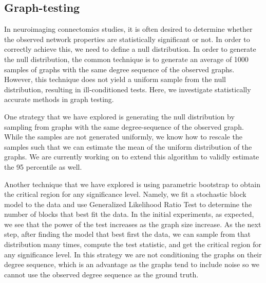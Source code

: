 \documentclass[simplex.tex]{subfiles}
\begin{document}
\subsection{Graph-testing}

In neuroimaging connectomics studies, it is often desired to determine whether the observed network properties are statistically significant or not. In order to correctly achieve this, we need to define a null distribution. In order to generate the null distribution, the common technique is to  generate an average of 1000 samples of graphs with the same degree sequence of the observed graphs. However, this technique does not yield a uniform sample from the null distribution, resulting in ill-conditioned tests. Here, we investigate statistically accurate methods in graph testing. 

One strategy that we have explored is generating the null distribution by sampling from graphs with the same degree-sequence of the observed graph. While the samples are not generated uniformly, we know how to rescale the samples such that we can estimate the mean of the uniform distribution of the graphs. We are currently working on to extend this algorithm to validly estimate the 95 percentile as well. 

Another technique that we have explored is using parametric bootstrap to obtain the critical region for any significance level. Namely, we fit a stochastic block model to the data and use Generalized Likelihood Ratio Test to determine the number of blocks that best fit the data. In the initial experiments, as expected, we see that the power of the test increases as the graph size increase. As the next step, after finding the model that best first the data, we can sample from that distribution many times, compute the test statistic, and get the critical region for any significance level. In this strategy we are not conditioning the graphs on their degree sequence, which is an advantage as the graphs tend to include noise so we cannot use the observed degree sequence as the ground truth. 

\end{document}
